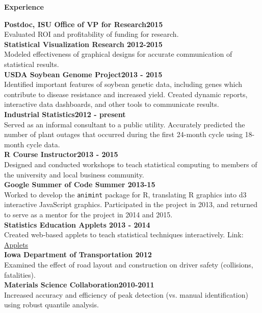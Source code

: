 \documentclass[letterpaper,12pt,final]{memoir}
\newcommand{\SmallSep}{\vspace{0.5em}}
\newcommand{\CVSection}[1]
	{\Large\textbf{#1}\par
	\SmallSep\normalsize\normalfont}
\newcommand{\CVItem}[1]
	{\textbf{\color{RoyalBlue} #1}}
\begin{document}
\CVSection{Experience}
\begin{multicols}{2}
\CVItem{Postdoc, ISU Office of VP for Research\hfill 2015}\\
{\small Evaluated ROI and profitability of funding for research.\SmallSep\\}
\CVItem{Statistical Visualization Research \hfill 2012-2015}\\
{\small Modeled effectiveness of graphical designs for accurate communication of statistical results. \SmallSep\\}
\CVItem{USDA Soybean Genome Project\hfill 2013 - 2015}\\
{\small Identified important features of soybean genetic data, including genes which contribute to disease resistance and increased yield. Created dynamic reports, interactive data dashboards, and other tools to communicate results. \SmallSep\\}
\CVItem{Industrial Statistics\hfill 2012 - present}\\
{\small Served as an informal consultant to a public utility. Accurately predicted the number of plant outages that occurred during the first 24-month cycle using 18-month cycle data. 
\SmallSep\\}
\CVItem{R Course Instructor\hfill 2013 - 2015}\\
{\small Designed and conducted workshops to teach statistical computing to members of the university and local business community. \SmallSep\\}
\CVItem{Google Summer of Code \hfill Summer 2013-15}\\
{\small Worked to develop the \texttt{animint} package for R, translating R graphics into d3 interactive JavaScript graphics. Participated in the project in 2013, and returned to serve as a mentor for the project in 2014 and 2015. \SmallSep\\}
\CVItem{Statistics Education Applets \hfill 2013 - 2014}\\
{\small Created web-based applets to teach statistical techniques interactively. Link: \href{http://vanderplas.dyndns-remote.com:3838/}{Applets} \SmallSep\\}
\CVItem{Iowa Department of Transportation \hfill 2012}\\
{\small Examined the effect of road layout and construction on driver safety (collisions, fatalities).\SmallSep\\}
\CVItem{Materials Science Collaboration\hfill 2010-2011}\\
{\small Increased accuracy and efficiency of peak detection (vs. manual identification) using robust quantile analysis. 
\SmallSep\\}\\\\\\\\
\end{multicols}
\end{document}
